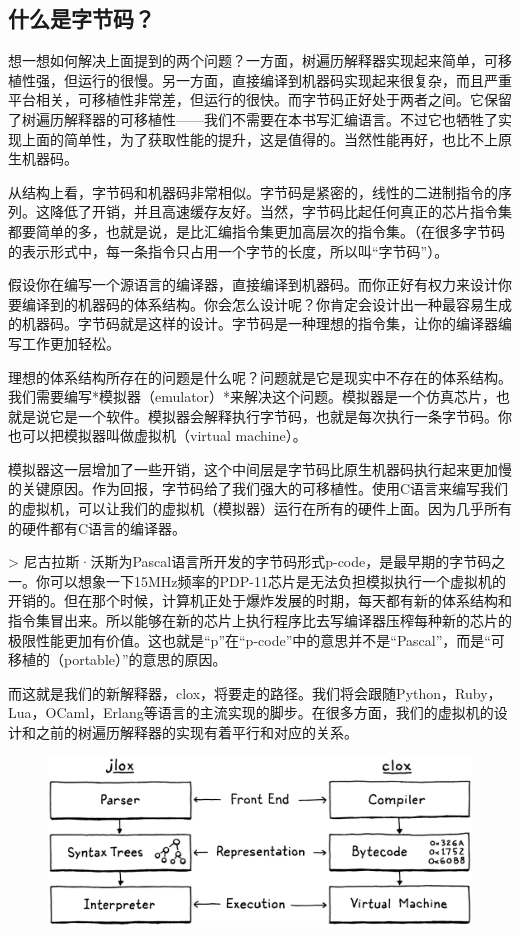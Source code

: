 \documentclass[cn,10pt,math=newtx,citestyle=gb7714-2015,bibstyle=gb7714-2015]{elegantbook}
\begin{document}
\subsection{什么是字节码？}

想一想如何解决上面提到的两个问题？一方面，树遍历解释器实现起来简单，可移植性强，但运行的很慢。另一方面，直接编译到机器码实现起来很复杂，而且严重平台相关，可移植性非常差，但运行的很快。而字节码正好处于两者之间。它保留了树遍历解释器的可移植性——我们不需要在本书写汇编语言。不过它也牺牲了实现上面的简单性，为了获取性能的提升，这是值得的。当然性能再好，也比不上原生机器码。

从结构上看，字节码和机器码非常相似。字节码是紧密的，线性的二进制指令的序列。这降低了开销，并且高速缓存友好。当然，字节码比起任何真正的芯片指令集都要简单的多，也就是说，是比汇编指令集更加高层次的指令集。（在很多字节码的表示形式中，每一条指令只占用一个字节的长度，所以叫“字节码”）。

假设你在编写一个源语言的编译器，直接编译到机器码。而你正好有权力来设计你要编译到的机器码的体系结构。你会怎么设计呢？你肯定会设计出一种最容易生成的机器码。字节码就是这样的设计。字节码是一种理想的指令集，让你的编译器编写工作更加轻松。

理想的体系结构所存在的问题是什么呢？问题就是它是现实中不存在的体系结构。我们需要编写*模拟器（emulator）*来解决这个问题。模拟器是一个仿真芯片，也就是说它是一个软件。模拟器会解释执行字节码，也就是每次执行一条字节码。你也可以把模拟器叫做虚拟机（virtual machine）。

模拟器这一层增加了一些开销，这个中间层是字节码比原生机器码执行起来更加慢的关键原因。作为回报，字节码给了我们强大的可移植性。使用C语言来编写我们的虚拟机，可以让我们的虚拟机（模拟器）运行在所有的硬件上面。因为几乎所有的硬件都有C语言的编译器。

> 尼古拉斯·沃斯为Pascal语言所开发的字节码形式p-code，是最早期的字节码之一。你可以想象一下15MHz频率的PDP-11芯片是无法负担模拟执行一个虚拟机的开销的。但在那个时候，计算机正处于爆炸发展的时期，每天都有新的体系结构和指令集冒出来。所以能够在新的芯片上执行程序比去写编译器压榨每种新的芯片的极限性能更加有价值。这也就是“p”在“p-code”中的意思并不是“Pascal”，而是“可移植的（portable）”的意思的原因。

而这就是我们的新解释器，clox，将要走的路径。我们将会跟随Python，Ruby，Lua，OCaml，Erlang等语言的主流实现的脚步。在很多方面，我们的虚拟机的设计和之前的树遍历解释器的实现有着平行和对应的关系。

\begin{figure}[h]
\centering
\includegraphics[width=\textwidth]{image/chunks-of-bytecode/phases.png}
\end{figure}
\end{document}
